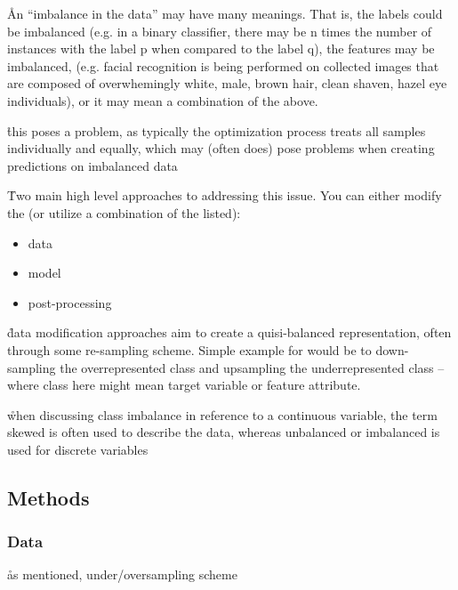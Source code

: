 \r{An ``imbalance in the data'' may have many meanings. That is, the labels could be imbalanced (e.g. in a binary classifier, there may be n times the number of instances with the label p when compared to the label q), the features may be imbalanced, (e.g. facial recognition is being performed on collected images that are composed of overwhemingly white, male, brown hair, clean shaven, hazel eye individuals), or it may mean a combination of the above.}

\r{this poses a problem, as typically the optimization process treats all samples individually and equally, which may (often does) pose problems when creating predictions on imbalanced data}

\r{Two main high level approaches to addressing this issue. You can either modify the (or utilize a combination of the listed):}
\begin{itemize}[noitemsep,topsep=0pt]
	\item data
	\item model
	\item post-processing
\end{itemize}

\r{data modification approaches aim to create a quisi-balanced representation, often through some re-sampling scheme. Simple example for would be to down-sampling the overrepresented class and upsampling the underrepresented class -- where class here might mean target variable or feature attribute.}

\r{when discussing class imbalance in reference to a continuous variable, the term skewed is often used to describe the data, whereas unbalanced or imbalanced is used for discrete variables}


\subsection{Methods}


\subsubsection{Data}

\r{as mentioned, under/oversampling scheme}


